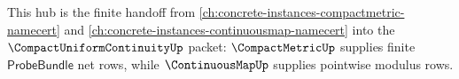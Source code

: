 This hub is the finite handoff from \autoref{ch:concrete-instances-compactmetric-namecert} and \autoref{ch:concrete-instances-continuousmap-namecert} into the $\CompactUniformContinuityUp$ packet: $\CompactMetricUp$ supplies finite $\mathsf{ProbeBundle}$ net rows, while $\ContinuousMapUp$ supplies pointwise modulus rows.





